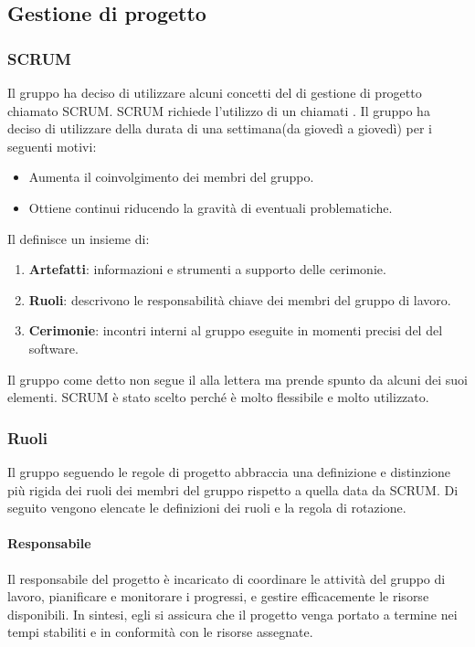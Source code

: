 \subsection{Gestione di progetto}
\label{subsec:gestione_progetto}

\subsubsection{SCRUM}
Il gruppo ha deciso di utilizzare alcuni concetti del  di gestione di progetto  chiamato SCRUM.
SCRUM richiede l'utilizzo di un  chiamati \textbf{}.
Il gruppo ha deciso di utilizzare  della durata di una settimana(da giovedì a giovedì) per i seguenti motivi:
\begin{itemize}
    \item Aumenta il coinvolgimento dei membri del gruppo.
    \item Ottiene  continui riducendo la gravità di eventuali problematiche.
\end{itemize}
Il  definisce un insieme di:
\begin{enumerate}
    \item \textbf{Artefatti}: informazioni e strumenti a supporto delle cerimonie.
   
    \item \textbf{Ruoli}: descrivono le responsabilità chiave dei membri del gruppo di lavoro.
    
    \item \textbf{Cerimonie}: incontri interni al gruppo eseguite in momenti precisi del  del software.
\end{enumerate}
Il gruppo come detto non segue il  alla lettera ma prende spunto da alcuni dei suoi elementi.
SCRUM è stato scelto perché è molto flessibile e molto utilizzato. 

\subsubsection{Ruoli}
\label{subsubsec:ruoli}
Il gruppo seguendo le regole di progetto abbraccia una definizione e distinzione più rigida dei ruoli dei membri del gruppo rispetto a quella data da SCRUM.  
Di seguito vengono elencate le definizioni dei ruoli e la regola di rotazione.

\paragraph{Responsabile}
Il responsabile del progetto è incaricato di coordinare le attività del gruppo di lavoro, pianificare e monitorare i progressi, e gestire efficacemente le risorse disponibili. In sintesi, egli si assicura che il progetto venga portato a termine nei tempi stabiliti e in conformità con le risorse assegnate.


